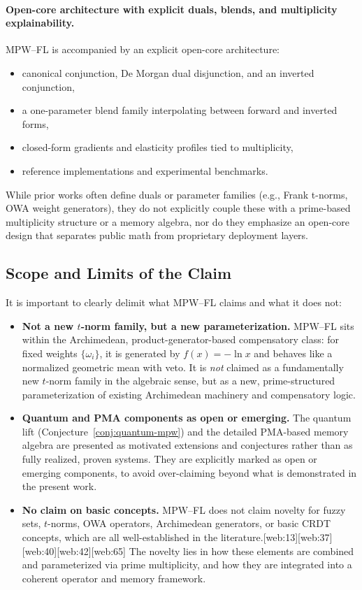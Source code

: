 \documentclass[11pt]{article}
\begin{document}
\paragraph{Open-core architecture with explicit duals, blends, and multiplicity explainability.}
MPW--FL is accompanied by an explicit open-core architecture:
\begin{itemize}
  \item canonical conjunction, De Morgan dual disjunction, and an inverted conjunction,
  \item a one-parameter blend family interpolating between forward and inverted forms,
  \item closed-form gradients and elasticity profiles tied to multiplicity,
  \item reference implementations and experimental benchmarks.
\end{itemize}
While prior works often define duals or parameter families (e.g., Frank t-norms, OWA weight generators), they do not explicitly couple these with a prime-based multiplicity structure or a memory algebra, nor do they emphasize an open-core design that separates public math from proprietary deployment layers.

\subsection{Scope and Limits of the Claim}
\label{subsec:scope-limits}

It is important to clearly delimit what MPW--FL claims and what it does not:

\begin{itemize}
  \item \textbf{Not a new $t$-norm family, but a new parameterization.} MPW--FL sits within the Archimedean, product-generator-based compensatory class: for fixed weights $\{\omega_i\}$, it is generated by $f(x)=-\ln x$ and behaves like a normalized geometric mean with veto. It is \emph{not} claimed as a fundamentally new $t$-norm family in the algebraic sense, but as a new, prime-structured parameterization of existing Archimedean machinery and compensatory logic.
  \item \textbf{Quantum and PMA components as open or emerging.} The quantum lift (Conjecture~\ref{conj:quantum-mpw}) and the detailed PMA-based memory algebra are presented as motivated extensions and conjectures rather than as fully realized, proven systems. They are explicitly marked as open or emerging components, to avoid over-claiming beyond what is demonstrated in the present work.
  \item \textbf{No claim on basic concepts.} MPW--FL does not claim novelty for fuzzy sets, $t$-norms, OWA operators, Archimedean generators, or basic CRDT concepts, which are all well-established in the literature.[web:13][web:37][web:40][web:42][web:65] The novelty lies in how these elements are combined and parameterized via prime multiplicity, and how they are integrated into a coherent operator and memory framework.
\end{itemize}
\end{document}
